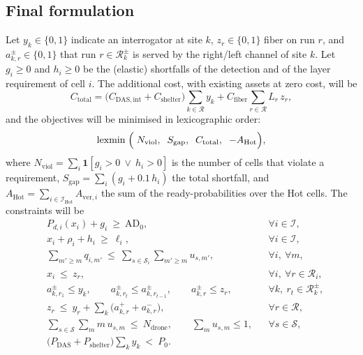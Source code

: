 \documentclass[11pt,a4paper]{article}
\newcommand{\ADzero}{\mathrm{AD}_{0}}
\newcommand{\Ctotal}{C_{\mathrm{total}}}
\newcommand{\Pzero}{P_{0}}
\begin{document}
\subsection{Final formulation}
Let $y_k\in\{0,1\}$ indicate an interrogator at site $k$, $z_r\in\{0,1\}$ fiber on run $r$, and $a^{\pm}_{k,r}\in\{0,1\}$ that run $r\in\mathcal{R}_k^{\pm}$ is served by the right/left channel of site $k$.
Let $g_i\ge0$ and $h_i\ge0$ be the (elastic) shortfalls of the detection and of the layer requirement of cell $i$. The additional cost, with existing assets at zero cost, will be
\begin{equation}
  \Ctotal=\bigl(C_{\mathrm{DAS,int}}+C_{\mathrm{shelter}}\bigr)\sum_{k\in\mathcal{R}}y_k+C_{\mathrm{fiber}}\sum_{r\in\mathcal{R}}L_r\,z_r ,
  \label{eq:ctotal}
\end{equation}
and the objectives will be minimised in lexicographic order:
\begin{equation}
  \operatorname*{lexmin}\;\Bigl(\;N_{\mathrm{viol}},\;\;S_{\mathrm{gap}},\;\;\Ctotal,\;\;-A_{\mathrm{Hot}}\Bigr),
  \label{eq:objective}
\end{equation}
where $N_{\mathrm{viol}}=\sum_i\mathbf{1}[g_i>0\ \lor\ h_i>0]$ is the number of cells that violate a requirement, $S_{\mathrm{gap}}=\sum_i(g_i+0.1\,h_i)$ the total shortfall,
and $A_{\mathrm{Hot}}=\sum_{i\in\mathcal{I}_{\mathrm{Hot}}}A_{\mathrm{ver},i}$ the sum of the ready-probabilities over the Hot cells. The constraints will be
\begin{subequations}
\label{eq:constraints}
\begin{align}
  & P_{d,i}(x_i)+g_i\ \ge\ \ADzero, && \forall i\in\mathcal{I}, \label{eq:c-det}\\
  & x_i+\rho_i+h_i\ \ge\ \ell_i, && \forall i\in\mathcal{I}, \label{eq:c-layers}\\
  & \textstyle\sum_{m'\ge m}q_{i,m'}\ \le\ \sum_{s\in\mathcal{S}_i}\sum_{m'\ge m}u_{s,m'}, && \forall i,\ \forall m, \label{eq:c-link}\\
  & x_i\ \le\ z_r, && \forall i,\ \forall r\in\mathcal{R}_i, \label{eq:c-fiber}\\
  & a^{\pm}_{k,r_1}\le y_k,\qquad a^{\pm}_{k,r_t}\le a^{\pm}_{k,r_{t-1}},\qquad a^{\pm}_{k,r}\le z_r, && \forall k,\ r_t\in\mathcal{R}_k^{\pm}, \label{eq:c-contig}\\
  & z_r\ \le\ y_r+\textstyle\sum_{k}\bigl(a^{+}_{k,r}+a^{-}_{k,r}\bigr), && \forall r\in\mathcal{R}, \label{eq:c-service}\\
  & \textstyle\sum_{s\in\mathcal{S}}\sum_{m}m\,u_{s,m}\ \le\ N_{\mathrm{drone}},\qquad \textstyle\sum_mu_{s,m}\le1, && \forall s\in\mathcal{S}, \label{eq:c-drones}\\
  & \bigl(P_{\mathrm{DAS}}+P_{\mathrm{shelter}}\bigr)\textstyle\sum_{k}y_k\ <\ \Pzero . \label{eq:c-power}
\end{align}
\end{subequations}
\end{document}
